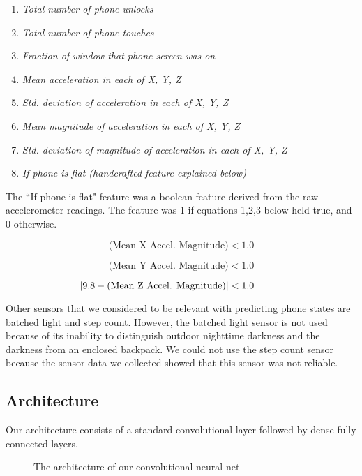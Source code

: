 \begin{enumerate}
\item \textit{Total number of phone unlocks}
\item \textit{Total number of phone touches}
\item \textit{Fraction of window that phone screen was on}
\item \textit{Mean acceleration in each of X, Y, Z}
\item \textit{Std. deviation of acceleration in each of X, Y, Z}
\item \textit{Mean magnitude of acceleration in each of X, Y, Z}
\item \textit{Std. deviation of magnitude of acceleration in each of X, Y, Z}
\item \textit{If phone is flat (handcrafted feature explained below)}
\end{enumerate}

The ``If phone is flat" feature was a boolean feature derived from the raw accelerometer readings. 
The feature was 1 if equations 1,2,3 below held true, and 0 otherwise.

\begin{equation}\label{eq1}
 \text{(Mean X Accel. Magnitude)} < 1.0 
\end{equation}

\begin{equation}\label{eq2}
\text{(Mean Y Accel. Magnitude)} < 1.0
\end{equation}

\begin{equation}\label{eq1}
\hspace*{-1cm}|9.8 - \text{(Mean Z Accel. Magnitude)}| < 1.0
\end{equation}

Other sensors that we considered to be relevant with predicting phone states are batched light and step count.
However, the batched light sensor is not used because of its inability to distinguish outdoor nighttime darkness and the darkness from an enclosed backpack. 
We could not use the step count sensor because the sensor data we collected showed that this sensor was not reliable. 

\subsection{Architecture}
Our architecture consists of a standard convolutional layer followed by dense fully connected layers.


\begin{figure*}[!h]
  \vspace{-0.2cm}
  \centering
   {}
  \caption{The architecture of our convolutional neural net}
  \label{fig:ConvNet}
  \vspace{-0.1cm}
\end{figure*}

